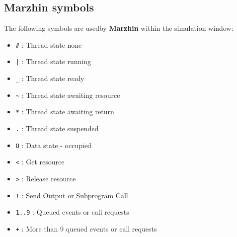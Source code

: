 \documentclass[11pt]{book}
\begin{document}
   \subsection{Marzhin symbols}
   The following symbols are usedby \textbf{Marzhin} within the simulation
   window:
   \begin{itemize}
      \item 
         \texttt{\#} : Thread state none
      \item 
         \texttt{|} : Thread state running
      \item 
         \texttt{\_} : Thread state ready
      \item 
         \texttt{\~} : Thread state awaiting resource
      \item 
         \texttt{*} : Thread state awaiting return
      \item 
         \texttt{.} : Thread state suspended
      \item 
         \texttt{O} : Data state - occupied
      \item 
         \texttt{<} : Get resource
      \item 
         \texttt{>} : Release resource
      \item 
         \texttt{!} : Send Output or Subprogram Call
      \item 
         \texttt{1..9} : Queued events or call requests
      \item 
         \texttt{+} : More than 9 queued events or call requests
   \end{itemize}
\end{document}
